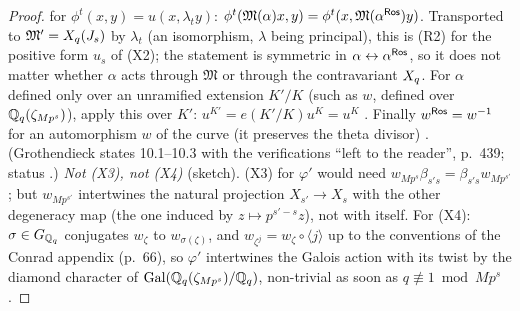 \begin{proof}
for $\phi^t(x,y)=u(x,\lambda_ty)$: $\phi^t(\mathfrak{M}(\alpha)x,y)=\phi^t(x,\mathfrak{M}(\alpha^{\mathsf{Ros}})y)$. Transported to $\mathfrak{M}'=X_q(J_s)$ by $\lambda_t$ (an isomorphism, $\lambda$ being principal), this is
(R2) for the positive form $u_s$ of (X2); the statement is symmetric in $\alpha\leftrightarrow\alpha^{\mathsf{Ros}}$, so it does not matter whether $\alpha$ acts through
$\mathfrak{M}$ or through the contravariant $X_q$. For $\alpha$ defined only over an unramified extension $K'/K$ (such as $w$, defined over $\mathbb{Q}_q(\zeta_{Mp^s})$),
apply this over $K'$: $u^{K'}=e(K'/K)u^K=u^K$
. Finally $w^{\mathsf{Ros}}=w^{-1}$ for an
automorphism $w$ of the curve (it preserves the theta divisor) \stknown. (Grothendieck states 10.1--10.3 with the verifications ``left to the
reader'', p.~439; status \stpmc.)
\emph{Not (X3), not (X4)} (sketch). (X3) for $\varphi'$ would need $w_{Mp^s}\beta_{s's}=\beta_{s's}w_{Mp^{s'}}$; but $w_{Mp^{s'}}$ intertwines the natural
projection $X_{s'}\to X_s$ with the other degeneracy map (the one induced by $z\mapsto p^{s'-s}z$), not with itself. For (X4):
$\sigma\in G_{\mathbb{Q}_q}$ conjugates $w_\zeta$ to $w_{\sigma(\zeta)}$, and $w_{\zeta^j}=w_\zeta\circ\langle j\rangle$ up to the conventions of the Conrad
appendix (p.~66), so $\varphi'$ intertwines the Galois action with its twist by the diamond character of $\mathrm{Gal}(\mathbb{Q}_q(\zeta_{Mp^s})/\mathbb{Q}_q)$,
non-trivial as soon as $q\not\equiv1\bmod Mp^s$.
\end{proof}

